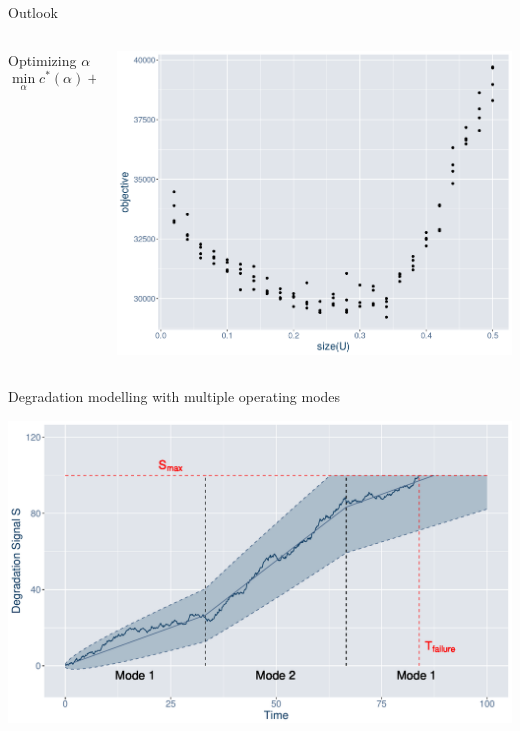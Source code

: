 \documentclass[slides]{beamer}
\begin{document}
\begin{frame}{Outlook}
\begin{columns}
    \begin{column}{0.48\textwidth}
        \begin{block}{Optimizing $\alpha$}
            \begin{equation*}
            \min_{\alpha} c^*(\alpha) + \sum_{j} p^f_{j}(\alpha)\cdot c_{j}^f
            \end{equation*}
        \end{block}
    \end{column}
    \begin{column}{0.48\textwidth}
            \includegraphics[width=\linewidth]{boobj-vs-alpha.png}
    \end{column}
\end{columns}

\end{frame}


\begin{frame}{Degradation modelling with multiple operating modes}
\begin{center}
    \includegraphics[scale=0.46]{example-wiener-om.pdf} \\
\end{center}
\end{frame}
\end{document}
